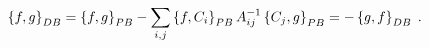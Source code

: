 \begin{equation}
\left\{  f,g\right\}  _{{\footnotesize DB}}=\left\{  f,g\right\}
_{{\footnotesize PB}}-\sum_{i,j}\left\{  f,C_{i}\right\}  _{{\footnotesize PB}%
}A_{ij}^{-1}\left\{  C_{j},g\right\}  _{{\footnotesize PB}}=-\left\{
g,f\right\}  _{{\footnotesize DB}}\;. \label{DBDefn}%
\end{equation}

